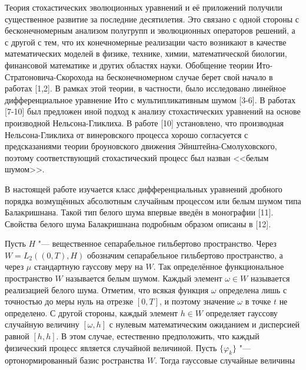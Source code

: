 


\vzmscaption


Теория стохастических эволюционных уравнений и её приложений получили существенное развитие за последние десятилетия. Это связано с одной стороны с бесконечномерным анализом полугрупп и эволюционных операторов решений, а с другой с тем, что их конечномерные реализации часто возникают в качестве математических моделей в физике, технике,
химии, математической биологии, финансовой математике и других областях науки. Обобщение теории Ито-Стратоновича-Скорохода на бесконечномерном случае берет свой начало в работах [1,2]. В рамках этой теории, в частности, было исследовано линейное дифференциальное уравнение Ито с мультипликативным шумом [3-6]. В работах [7-10] был
предложен иной подход к анализу стохастических уравнений на основе производной Нельсона-Гликлиха. В работе [10] установлено, что производная Нельсона-Гликлиха от винеровского процесса хорошо согласуется с предсказаниями теории броуновского движения Эйнштейна-Смолуховского, поэтому соответствующий стохастический процесс был назван <<белым шумом>>.

В настоящей работе изучается класс дифференциальных уравнений дробного порядка возмущённых абсолютным случайным процессом или белым шумом типа Балакришнана. Такой тип белого шума впервые введён в монографии [11]. Свойства белого шума Балакришнана подробным образом описаны в [12].

Пусть $H$ "--- вещественное сепарабельное гильбертово пространство. Через $W=L_{2}((0,T),H)$ обозначим сепарабельное гильбертово пространство, а через $\mu$ стандартную гауссову меру на $W$. Так определённое функциональное пространство $W$ называется белым шумом. Каждый элемент $\omega\in W$ называется реализацией белого шума. Отметим, что всякая функция $\omega$ определена лишь с точностью до меры нуль на отрезке $[0, T]$, и поэтому значение $\omega$ в точке $t$ не определено. С другой стороны, каждый элемент $h\in W$ определяет гауссову случайную величину $[\omega, h]$ с нулевым математическим ожиданием и дисперсией равной $[h, h]$. В этом случае, естественно предположить, что каждый физический процесс является случайной величиной. Пусть $\{\varphi_{k}\}$ "--- ортонормированный базис ространства $W$. Тогда гауссовые случайные величины

